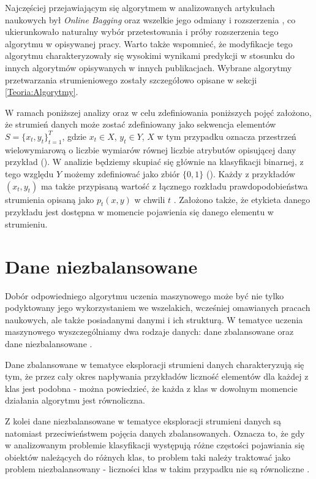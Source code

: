 Najczęściej przejawiającym się algorytmem w analizowanych artykułach naukowych był \textit{Online Bagging} oraz wszelkie jego odmiany i rozszerzenia \cite{Article:TypyPrzykladow}\cite{Article:ManyAlgorithms}\cite{Article:OBFirst}\cite{Article:OBSecond}, co ukierunkowało naturalny wybór przetestowania i próby rozszerzenia tego algorytmu w opisywanej pracy. Warto także wspomnieć, że modyfikacje tego algorytmu charakteryzowały się wysokimi wynikami predykcji w stosunku do innych algorytmów opisywanych w innych publikacjach. Wybrane algorytmy przetwarzania strumieniowego zostały szczegółowo opisane w sekcji \ref{Teoria:Algorytmy}.

W ramach poniższej analizy oraz w celu zdefiniowania poniższych pojęć założono, że strumień danych może zostać zdefiniowany jako sekwencja elementów $S = \{x_t, y_t\}^{T}_{t=1}$, gdzie $x_t \in X$, $y_t \in Y$, $X$ w tym przypadku oznacza przestrzeń wielowymiarową o liczbie wymiarów równej liczbie atrybutów opisującej dany przykład (). W analizie będziemy skupiać się głównie na klasyfikacji binarnej, z tego względu $Y$ możemy zdefiniować jako zbiór $\{0,1\}$ (). Każdy z przykładów $(x_t, y_t)$ ma także przypisaną wartość z łącznego rozkładu prawdopodobieństwa strumienia opisaną jako $p_t(x,y)$ w chwili $t$ \cite{Article:TypyPrzykladow}. Założono także, że etykieta danego przykładu jest dostępna w momencie pojawienia się danego elementu w strumieniu.

\section{Dane niezbalansowane}

\noindent Dobór odpowiedniego algorytmu uczenia maszynowego może być nie tylko podyktowany jego wykorzystaniem we wszelakich, wcześniej omawianych pracach naukowych, ale także posiadanymi danymi i ich strukturą. W tematyce uczenia maszynowego wyszczególniamy dwa rodzaje danych: dane zbalansowane oraz dane niezbalansowane \cite{Article:Inz}.

Dane zbalansowane w tematyce eksploracji strumieni danych charakteryzują się tym, że przez cały okres napływania przykładów liczność elementów dla każdej z klas jest podobna - można powiedzieć, że każda z klas w dowolnym momencie działania algorytmu jest równoliczna.

Z kolei dane niezbalansowane w tematyce eksploracji strumieni danych są natomiast przeciwieństwem pojęcia danych zbalansowanych. Oznacza to, że gdy w analizowanym problemie klasyfikacji występują różne częstości pojawiania się obiektów należących do różnych klas, to problem taki należy traktować jako problem niezbalansowany - liczności klas w takim przypadku nie są równoliczne \cite{Article:Inz}.

